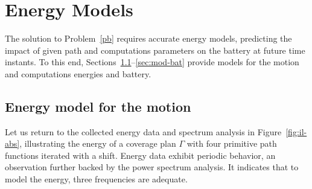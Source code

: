 \documentclass[letterpaper,10pt,journal,twoside]{IEEEtran}
\theoremstyle{definition}
\newtheorem{defn}{Definition}[section]
\newtheorem{pb}{Problem}[section]
\begin{document}





\section{Energy Models}  %
\label{sec:energy-model}         %
The solution to Problem~\ref{pb} requires accurate energy models, predicting the impact of given path and computations parameters on the battery at future time instants. To this end, Sections~\ref{sec:mod-mot}--\ref{sec:mod-bat} provide models for the motion and computations energies and battery.

\subsection{Energy model for the motion}
\label{sec:mod-mot}

Let us return to the collected energy data and spectrum analysis in Figure~\ref{fig:il-abs}, illustrating the energy of a coverage plan $\Gamma$ with four primitive path functions iterated with a shift. Energy data exhibit periodic behavior, an observation further backed by the power spectrum analysis. It indicates that to model the energy, three frequencies are adequate.
\end{document}
